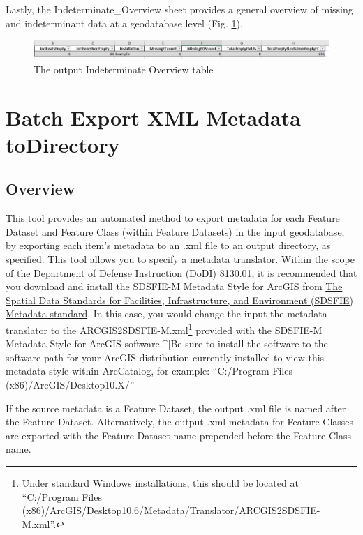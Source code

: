 \documentclass[openany]{book}
\let\rmarkdownfootnote\footnote%
\def\footnote{\protect\rmarkdownfootnote}
\theoremstyle{definition}
\theoremstyle{definition}
\theoremstyle{definition}
\theoremstyle{remark}
\begin{document}
Lastly, the Indeterminate\_Overview sheet provides a general overview of
missing and indeterminant data at a geodatabase level (Fig.
\ref{fig:summIndtsheet4}).

\begin{figure}[H]

{\centering \includegraphics[width=5.67in,]{figures/summIndt-sheet4} 

}

\caption{The output Indeterminate Overview table}\label{fig:summIndtsheet4}
\end{figure}

\hypertarget{exMeta}{\chapter{Batch Export XML Metadata
toDirectory}\label{exMeta}}

\section{Overview}\label{overview-11}

This tool provides an automated method to export metadata for each
Feature Dataset and Feature Class (within Feature Datasets) in the input
geodatabase, by exporting each item's metadata to an .xml file to an
output directory, as specified. This tool allows you to specify a
metadata translator. Within the scope of the Department of Defense
Instruction (DoDI) 8130.01, it is recommended that you download and
install the SDSFIE-M Metadata Style for ArcGIS from
\href{https://www.sdsfieonline.org/Standards/Metadata}{The Spatial Data
Standards for Facilities, Infrastructure, and Environment (SDSFIE)
Metadata standard}. In this case, you would change the input the
metadata translator to the ARCGIS2SDSFIE-M.xml\footnote{Under standard
  Windows installations, this should be located at ``C:/Program Files
  (x86)/ArcGIS/Desktop10.6/Metadata/Translator/ARCGIS2SDSFIE-M.xml''.}
provided with the SDSFIE-M Metadata Style for ArcGIS software.\^{}{[}Be
sure to install the software to the software path for your ArcGIS
distribution currently installed to view this metadata style within
ArcCatalog, for example: ``C:/Program Files (x86)/ArcGIS/Desktop10.X/''

If the source metadata is a Feature Dataset, the output .xml file is
named after the Feature Dataset. Alternatively, the output .xml metadata
for Feature Classes are exported with the Feature Dataset name prepended
before the Feature Class name.
\end{document}
